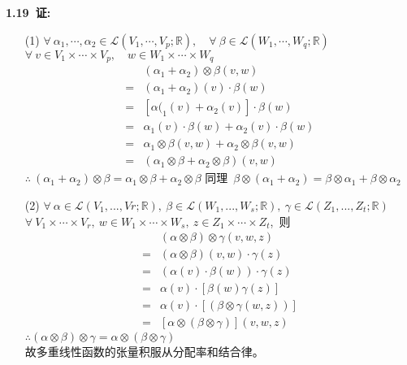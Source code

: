 \noindent
\\
\\
{\textbf{1.19\ 证:}}
\begin{itemize}
	\item [(1)]
	$\forall \ \alpha_1,\cdots ,\alpha_2\in \mathscr{L}(V_1,\cdots ,V_p;\mathbb{R}),\quad \forall \ \beta \in \mathscr{L}(W_1,\cdots ,W_q;\mathbb{R}) $
	\\
	$  \forall \ v\in V_1\times \cdots \times V_p,\quad w\in W_1\times \cdots \times W_q$ 
	\begin{align*}
	  &(\alpha_1+\alpha_2)\otimes\beta (v,w)
	\\
	=&(\alpha_1+\alpha_2)(v)\cdot \beta (w)
	\\
	=&[\alpha(_1(v)+\alpha_2(v)]\cdot \beta(w)
	\\
	=&\alpha_1(v)\cdot \beta(w)+\alpha_2(v)\cdot \beta(w)
	\\
	=&\alpha_1\otimes \beta (v,w)+\alpha_2 \otimes \beta (v,w)
	\\
	=&(\alpha_1\otimes\beta +\alpha_2\otimes\beta )(v,w)
	\end{align*}
	$\therefore \ (\alpha_1+\alpha_2)\otimes \beta =\alpha_1\otimes \beta +\alpha_2\otimes \beta $
	同理\ $\beta\otimes(\alpha_1+\alpha_2)=\beta \otimes \alpha_1+\beta \otimes \alpha_2$
	\item [(2)]
	$\forall \ \alpha \in \mathscr{L}(V_1,...,Vr;\mathbb{R}),\ \beta \in \mathscr{L}(W_1,...,W_s;\mathbb{R}),\ \gamma \in \mathscr{L}(Z_1,...,Z_t;\mathbb{R})$
	\\
	$\forall \ V_1\times \cdots \times V_r,\ w\in W_1\times \cdots \times W_s,\ z\in Z_1\times \cdots \times Z_t$,\ 则
	\begin{align*}
	 &(\alpha \otimes \beta )\otimes\gamma (v,w,z)
	\\
	=&(\alpha \otimes \beta )(v,w)\cdot \gamma (z)
	\\
	=&(\alpha(v)\cdot \beta (w))\cdot \gamma(z)
	\\
	=&\alpha(v)\cdot [\beta(w)\gamma(z)]
	\\
	=&\alpha(v)\cdot [(\beta \otimes \gamma(w,z))]
	\\
	=&[\alpha\otimes(\beta\otimes\gamma)](v,w,z)
	\end{align*}
	$\therefore (\alpha\otimes\beta)\otimes\gamma=\alpha\otimes(\beta\otimes\gamma)$
	\\
	故多重线性函数的张量积服从分配率和结合律。
\end{itemize}





